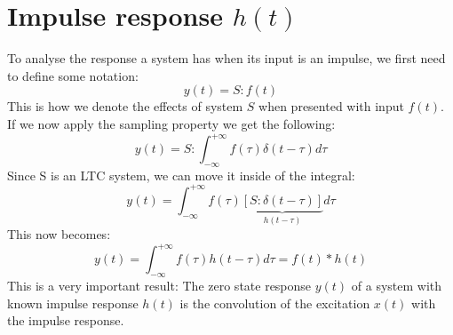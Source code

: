 \documentclass[]{subfiles}
\begin{document}
	\section{Impulse response $h(t)$}
	To analyse the response a system has when its input is an impulse, we first need to define some notation:
	\begin{equation*}
		y(t) = S:f(t)
	\end{equation*}
	This is how we denote the effects of  system $S$ when presented with input $f(t)$.   If we now apply the sampling property we get the following:
	\begin{equation*}
		y(t)=S:\int_{-\infty}^{+\infty}f(\tau)\delta(t-\tau)d\tau
	\end{equation*}
	Since S is an LTC system, we can move it inside of the integral:
	\begin{equation*}
		y(t)=\int_{-\infty}^{+\infty}f(\tau)\underbrace{\left[ S:\delta(t-\tau)\right] }_{h(t-\tau)}d\tau
	\end{equation*}
	This now becomes:
	\begin{equation*}
		y(t)=\int_{-\infty}^{+\infty}f(\tau)h(t-\tau)d\tau=f(t)\ast h(t)
	\end{equation*}
	This is a very important result: The zero  state  response  $y(t)$  of  a system  with  known  impulse  response $ h(t)$  is  the convolution of the excitation $x(t)$  with the impulse response. 
\end{document}
